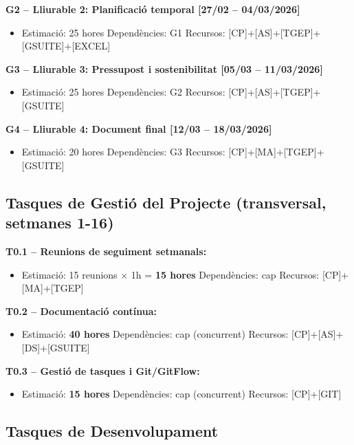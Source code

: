 \documentclass[12pt,a4paper,twoside]{report}
\begin{document}
\textbf{G2 -- Lliurable 2: Planificaci\'o temporal [27/02 -- 04/03/2026]}

\begin{itemize}
    \item Estimaci\'o: 25 hores \quad Depend\`encies: G1 \quad Recursos: [CP]+[AS]+[TGEP]+[GSUITE]+[EXCEL]
\end{itemize}

\textbf{G3 -- Lliurable 3: Pressupost i sostenibilitat [05/03 -- 11/03/2026]}

\begin{itemize}
    \item Estimaci\'o: 25 hores \quad Depend\`encies: G2 \quad Recursos: [CP]+[AS]+[TGEP]+[GSUITE]
\end{itemize}

\textbf{G4 -- Lliurable 4: Document final [12/03 -- 18/03/2026]}

\begin{itemize}
    \item Estimaci\'o: 20 hores \quad Depend\`encies: G3 \quad Recursos: [CP]+[MA]+[TGEP]+[GSUITE]
\end{itemize}

\subsection{Tasques de Gesti\'o del Projecte (transversal, setmanes 1-16)}
\label{subsec:tasques-gestio}

\textbf{T0.1 -- Reunions de seguiment setmanals:}
\begin{itemize}
    \item Estimaci\'o: 15 reunions $\times$ 1h = \textbf{15 hores} \quad Depend\`encies: cap \quad Recursos: [CP]+[MA]+[TGEP]
\end{itemize}

\textbf{T0.2 -- Documentaci\'o cont\'inua:}
\begin{itemize}
    \item Estimaci\'o: \textbf{40 hores} \quad Depend\`encies: cap (concurrent) \quad Recursos: [CP]+[AS]+[DS]+[GSUITE]
\end{itemize}

\textbf{T0.3 -- Gesti\'o de tasques i Git/GitFlow:}
\begin{itemize}
    \item Estimaci\'o: \textbf{15 hores} \quad Depend\`encies: cap (concurrent) \quad Recursos: [CP]+[GIT]
\end{itemize}

\subsection{Tasques de Desenvolupament}
\label{subsec:tasques-dev}
\end{document}
